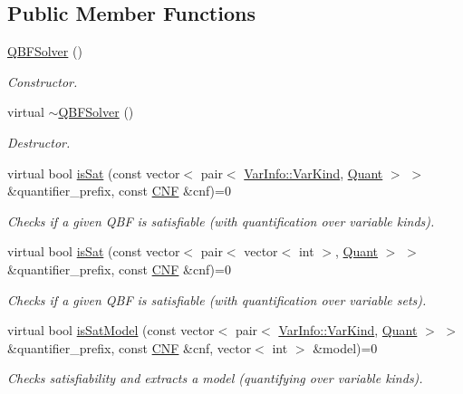 \subsection*{Public Member Functions}
\begin{DoxyCompactItemize}
\item 
\hyperlink{classQBFSolver_ab5a0b6c6cdcbb64a93a9d3dee844ddd3}{Q\-B\-F\-Solver} ()
\begin{DoxyCompactList}\small\item\em Constructor. \end{DoxyCompactList}\item 
virtual \hyperlink{classQBFSolver_a46d8bcb3b6ba6299eea0ae21973d7049}{$\sim$\-Q\-B\-F\-Solver} ()
\begin{DoxyCompactList}\small\item\em Destructor. \end{DoxyCompactList}\item 
virtual bool \hyperlink{classQBFSolver_a53ef157391b176dfbd2a77a1e31befc3}{is\-Sat} (const vector$<$ pair$<$ \hyperlink{classVarInfo_a64d1da76cf84fe674e5fef9764ef11cf}{Var\-Info\-::\-Var\-Kind}, \hyperlink{classQBFSolver_ac091e263cb55286cc07b2451bcf4d3c7}{Quant} $>$ $>$ \&quantifier\-\_\-prefix, const \hyperlink{classCNF}{C\-N\-F} \&cnf)=0
\begin{DoxyCompactList}\small\item\em Checks if a given Q\-B\-F is satisfiable (with quantification over variable kinds). \end{DoxyCompactList}\item 
virtual bool \hyperlink{classQBFSolver_aca37de5801e36d4749b80b6c8c2023a9}{is\-Sat} (const vector$<$ pair$<$ vector$<$ int $>$, \hyperlink{classQBFSolver_ac091e263cb55286cc07b2451bcf4d3c7}{Quant} $>$ $>$ \&quantifier\-\_\-prefix, const \hyperlink{classCNF}{C\-N\-F} \&cnf)=0
\begin{DoxyCompactList}\small\item\em Checks if a given Q\-B\-F is satisfiable (with quantification over variable sets). \end{DoxyCompactList}\item 
virtual bool \hyperlink{classQBFSolver_a76fc0c757a2c039816e3e06547f06d5c}{is\-Sat\-Model} (const vector$<$ pair$<$ \hyperlink{classVarInfo_a64d1da76cf84fe674e5fef9764ef11cf}{Var\-Info\-::\-Var\-Kind}, \hyperlink{classQBFSolver_ac091e263cb55286cc07b2451bcf4d3c7}{Quant} $>$ $>$ \&quantifier\-\_\-prefix, const \hyperlink{classCNF}{C\-N\-F} \&cnf, vector$<$ int $>$ \&model)=0
\begin{DoxyCompactList}\small\item\em Checks satisfiability and extracts a model (quantifying over variable kinds). \end{DoxyCompactList}\item 

\end{DoxyCompactItemize}

